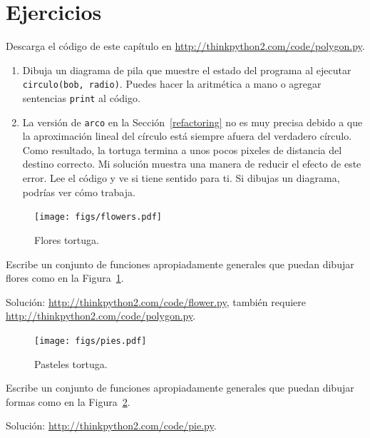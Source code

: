 \documentclass[10pt]{book}
\begin{document}
\section{Ejercicios}

\begin{exercise}

Descarga el código de este capítulo en
\url{http://thinkpython2.com/code/polygon.py}.

\begin{enumerate}

\item Dibuja un diagrama de pila que muestre el estado del programa
al ejecutar {\tt circulo(bob, radio)}.  Puedes hacer la
aritmética a mano o agregar sentencias {\tt print} al código.

\item La versión de {\tt arco} en la Sección~\ref{refactoring} no es
muy precisa debido a que la aproximación lineal del
círculo está siempre afuera del verdadero círculo.  Como resultado,
la tortuga termina a unos pocos pixeles de distancia del destino
correcto.  Mi solución muestra una manera de reducir
el efecto de este error.  Lee el código y ve si
tiene sentido para ti.  Si dibujas un diagrama, podrías ver cómo trabaja.

\end{enumerate}

\end{exercise}

\begin{figure}
\centerline
{\texttt{[image: figs/flowers.pdf]}}
\caption{Flores tortuga.}
\label{fig.flowers}
\end{figure}

\begin{exercise}

Escribe un conjunto de funciones apropiadamente generales que
puedan dibujar flores como en la Figura~\ref{fig.flowers}.

Solución: \url{http://thinkpython2.com/code/flower.py},
también requiere \url{http://thinkpython2.com/code/polygon.py}.

\end{exercise}

\begin{figure}
\centerline
{\texttt{[image: figs/pies.pdf]}}
\caption{Pasteles tortuga.}
\label{fig.pies}
\end{figure}


\begin{exercise}

Escribe un conjunto de funciones apropiadamente generales que
puedan dibujar formas como en la Figura~\ref{fig.pies}.

Solución: \url{http://thinkpython2.com/code/pie.py}.

\end{exercise}
\end{document}

